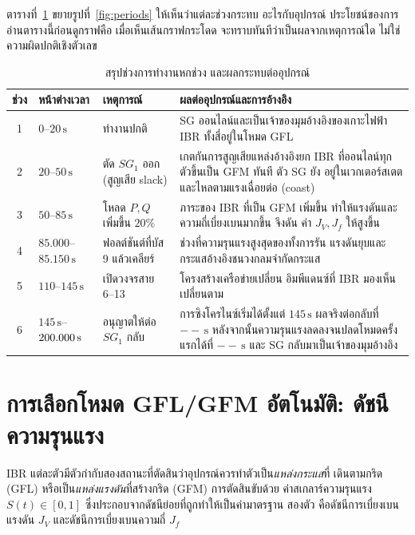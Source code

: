 \documentclass[12pt,a4paper]{article}
\newcommand{\second}{\,\mathrm{s}}
\newcommand{\NewRunReclose}{--}\newcommand{\NewRunFirstRelease}{--}%
\begin{document}
ตารางที่~\ref{tab:periods} ขยายรูปที่~\ref{fig:periods} ให้เห็นว่าแต่ละช่วงกระทบ
อะไรกับอุปกรณ์ ประโยชน์ของการอ่านตารางนี้ก่อนดูกราฟคือ เมื่อเห็นเส้นกราฟกระโดด
จะทราบทันทีว่าเป็นผลจากเหตุการณ์ใด ไม่ใช่ความผิดปกติเชิงตัวเลข

\begin{table}[H]
\centering\footnotesize
\caption{สรุปช่วงการทำงานหกช่วง และผลกระทบต่ออุปกรณ์}
\label{tab:periods}
\begin{tabularx}{\textwidth}{@{}c l >{\raggedright\arraybackslash}p{} X@{}}
\toprule
ช่วง & หน้าต่างเวลา & เหตุการณ์ & ผลต่ออุปกรณ์และการอ้างอิง \\ \midrule
1 & $0$--$20\second$ & ทำงานปกติ &
SG ออนไลน์และเป็นเจ้าของมุมอ้างอิงของเกาะไฟฟ้า IBR ทั้งสี่อยู่ในโหมด GFL \\
2 & $20$--$50\second$ & ตัด $SG_1$ ออก (สูญเสีย slack) &
เกตกันการสูญเสียแหล่งอ้างอิงยก IBR ที่ออนไลน์ทุกตัวขึ้นเป็น GFM ทันที ตัว SG ยัง
อยู่ในเวกเตอร์สเตตและไหลตามแรงเฉื่อยต่อ (coast) \\
3 & $50$--$85\second$ & โหลด $P,Q$ เพิ่มขึ้น $20\%$ &
ภาระของ IBR ที่เป็น GFM เพิ่มขึ้น ทำให้แรงดันและความถี่เบี่ยงเบนมากขึ้น จึงดัน
ค่า $J_V,J_f$ ให้สูงขึ้น \\
4 & $85.000$--$85.150\second$ & ฟอลต์ชันต์ที่บัส 9 แล้วเคลียร์ &
ช่วงที่ความรุนแรงสูงสุดของทั้งการรัน แรงดันยุบและกระแสอ้างอิงชนวงกลมจำกัดกระแส \\
5 & $110$--$145\second$ & เปิดวงจรสาย 6--13 &
โครงสร้างเครือข่ายเปลี่ยน อิมพีแดนซ์ที่ IBR มองเห็นเปลี่ยนตาม \\
6 & $145\second$--$\NewRunEnd\second$ & อนุญาตให้ต่อ $SG_1$ กลับ &
การซิงโครไนซ์เริ่มได้ตั้งแต่ $145\second$ ผลจริงต่อกลับที่ $\NewRunReclose\second$
หลังจากนั้นความรุนแรงลดลงจนปลดโหมดครั้งแรกได้ที่
$\NewRunFirstRelease\second$ และ SG กลับมาเป็นเจ้าของมุมอ้างอิง \\
\bottomrule
\end{tabularx}
\end{table}
\newpage
\section{การเลือกโหมด GFL/GFM อัตโนมัติ: ดัชนีความรุนแรง}\label{sec:sev}
IBR แต่ละตัวมีตัวกำกับสองสถานะที่ตัดสินว่าอุปกรณ์ควรทำตัวเป็น\emph{แหล่งกระแส}ที่
เดินตามกริด (GFL) หรือเป็น\emph{แหล่งแรงดัน}ที่สร้างกริด (GFM) การตัดสินขับด้วย
ค่าสเกลาร์ความรุนแรง $S(t)\in[0,1]$ ซึ่งประกอบจากดัชนีย่อยที่ถูกทำให้เป็นค่ามาตรฐาน
สองตัว คือดัชนีการเบี่ยงเบนแรงดัน $J_V$ และดัชนีการเบี่ยงเบนความถี่ $J_f$
\end{document}
